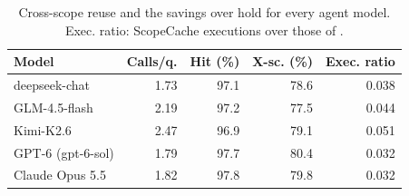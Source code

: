 \begin{table}[t]
\centering
\caption{Cross-scope reuse and the savings over  hold for every agent model. Exec. ratio: ScopeCache executions over those of .}
\label{tab:agentvendor}
\footnotesize
\setlength{\tabcolsep}{4pt}
\begin{tabular}{@{}lrrrr@{}}
\toprule
Model & Calls/q. & Hit (\%) & X-sc. (\%) & Exec. ratio\\
\midrule
deepseek-chat & 1.73 & 97.1 & 78.6 & 0.038\\
GLM-4.5-flash & 2.19 & 97.2 & 77.5 & 0.044\\
Kimi-K2.6 & 2.47 & 96.9 & 79.1 & 0.051\\
GPT-6 (gpt-6-sol) & 1.79 & 97.7 & 80.4 & 0.032\\
Claude Opus 5.5 & 1.82 & 97.8 & 79.8 & 0.032\\
\bottomrule
\end{tabular}
\end{table}
